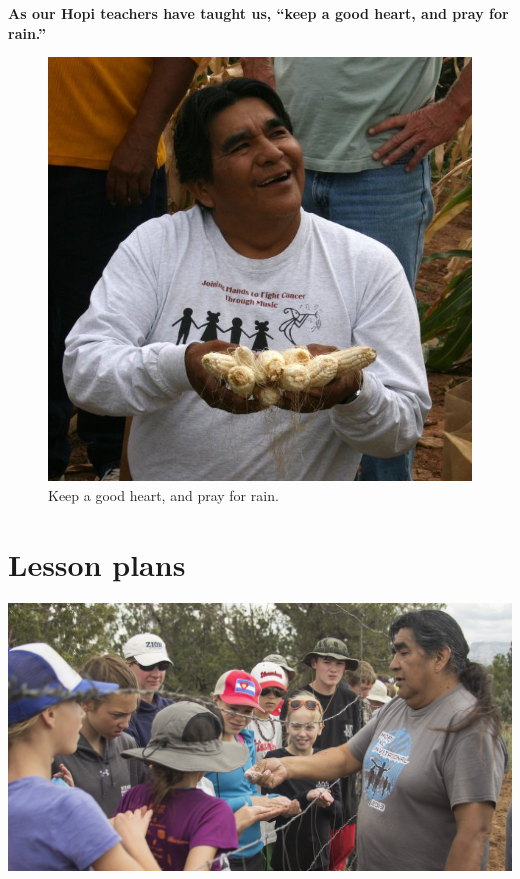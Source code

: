\documentclass[12pt,]{article}
\begin{document}
\textbf{As our Hopi teachers have taught us, ``keep a good heart, and pray for rain.''}

\begin{figure}
\centering
\includegraphics{./images/chapter_6_end_2.jpg}
\caption{Keep a good heart, and pray for rain.}
\end{figure}

\hypertarget{lesson-plans}{%
\section{Lesson plans}\label{lesson-plans}}

\includegraphics{./images/chapter_7_header.jpg}
\end{document}
